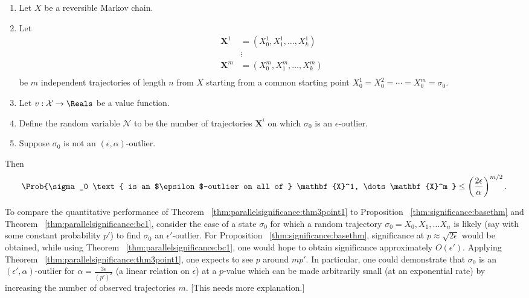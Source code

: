 \documentclass[12pt]{article}
\begin{document}
\begin{corollary}
    \label{cor:parallelsignificance:cor32}
    \begin{enumerate}
        \item
            Let \( X \) be a reversible Markov chain.
        \item
            Let
            \begin{align*}
                \mathbf{X}^1 &= (X_0^1, X_1^1, \dots, X_k^1 )\\
                &\vdots \\
                \mathbf{X}^m &= (X_0^m, X_1^m, \dots, X_k^m )\\
            \end{align*}
            be \( m \) independent trajectories of length \( n \) from \(
            X \) starting from a common starting point \( X_0^1 = X_0^2
            = \cdots = X_0^m = \sigma_0 \).
        \item
            Let \( v :  \mathcal{X} \to \Reals \) be a value function.
        \item
            Define the random variable \( \mathcal{N} \) to be the
            number of trajectories \( \mathbf{X}^i \) on which \( \sigma_0
            \) is an \( \epsilon \)-outlier.
        \item
            Suppose \( \sigma_0 \) is not an \( (\epsilon, \alpha) \)-outlier.
    \end{enumerate}
    Then
    \[
        \Prob{\sigma_0 \text{ is an $\epsilon$-outlier on all of } \mathbf
        {X}^1, \dots \mathbf{X}^m } \le \left( \frac{2\epsilon}{\alpha}
        \right)^{m/2}.
    \]
\end{corollary}

\begin{example}
    To compare the quantitative performance of Theorem~%
    \ref{thm:parallelsignificance:thm3point1} to Proposition~%
    \ref{thm:significance:basethm} and Theorem~%
    \ref{thm:parallelsignificance:bc1}, consider the case of a state \( \sigma_0
    \) for which a random trajectory \( \sigma_0 = X_0 , X_1 , \dots X_n
    \) is likely (say with some constant probability \( p' \)) to find \(
    \sigma_0 \) an \( \epsilon' \)-outlier.  For Proposition~%
    \ref{thm:significance:basethm}, significance at \( p \approx \sqrt{2\epsilon}
    \) would be obtained, while using Theorem~%
    \ref{thm:parallelsignificance:bc1}, one would hope to obtain significance
    approximately \( O(\epsilon') \).  Applying Theorem~%
    \ref{thm:parallelsignificance:thm3point1}, one expects to see \( p \)
    around \( m p' \).  In particular, one could demonstrate that \(
    \sigma_0 \) is an \( (\epsilon', \alpha) \)-outlier for \( \alpha =
    \frac{3\epsilon} {(p')^2} \) (a linear relation on \( \epsilon \))
    at a \( p \)-value which can be made arbitrarily small (at an
    exponential rate) by increasing the number of observed trajectories
    \( m \).  [This needs more explanation.]
\end{example}
\end{document}
